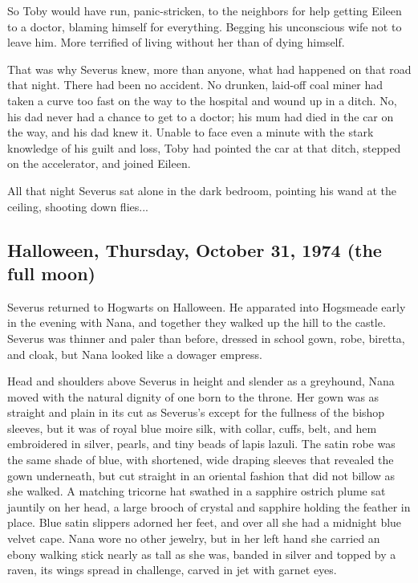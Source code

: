 \documentclass[a4paper,11pt]{article}
\begin{document}
So Toby would have run, panic-stricken, to the neighbors for help getting Eileen to a doctor, blaming himself for everything. Begging his unconscious wife not to leave him. More terrified of living without her than of dying himself.

That was why Severus knew, more than anyone, what had happened on that road that night. There had been no accident. No drunken, laid-off coal miner had taken a curve too fast on the way to the hospital and wound up in a ditch. No, his dad never had a chance to get to a doctor; his mum had died in the car on the way, and his dad knew it. Unable to face even a minute with the stark knowledge of his guilt and loss, Toby had pointed the car at that ditch, stepped on the accelerator, and joined Eileen.

All that night Severus sat alone in the dark bedroom, pointing his wand at the ceiling, shooting down flies...

\subsection{Halloween, Thursday, October 31, 1974 (the full moon)}

Severus returned to Hogwarts on Halloween. He apparated into Hogsmeade early in the evening with Nana, and together they walked up the hill to the castle. Severus was thinner and paler than before, dressed in school gown, robe, biretta, and cloak, but Nana looked like a dowager empress.

Head and shoulders above Severus in height and slender as a greyhound, Nana moved with the natural dignity of one born to the throne. Her gown was as straight and plain in its cut as Severus's except for the fullness of the bishop sleeves, but it was of royal blue moire silk, with collar, cuffs, belt, and hem embroidered in silver, pearls, and tiny beads of lapis lazuli. The satin robe was the same shade of blue, with shortened, wide draping sleeves that revealed the gown underneath, but cut straight in an oriental fashion that did not billow as she walked. A matching tricorne hat swathed in a sapphire ostrich plume sat jauntily on her head, a large brooch of crystal and sapphire holding the feather in place. Blue satin slippers adorned her feet, and over all she had a midnight blue velvet cape. Nana wore no other jewelry, but in her left hand she carried an ebony walking stick nearly as tall as she was, banded in silver and topped by a raven, its wings spread in challenge, carved in jet with garnet eyes.
\end{document}
